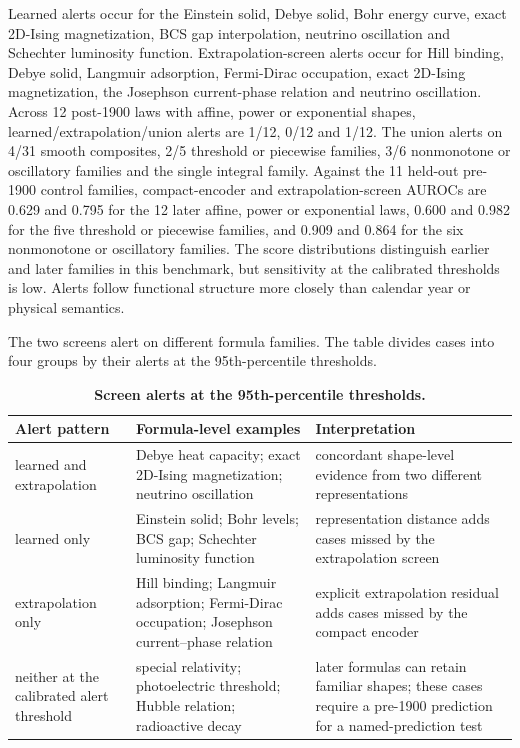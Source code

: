 \documentclass{article}
\begin{document}
Learned alerts occur for the Einstein solid, Debye solid, Bohr energy curve, exact 2D-Ising magnetization, BCS gap interpolation, neutrino oscillation and Schechter luminosity function. Extrapolation-screen alerts occur for Hill binding, Debye solid, Langmuir adsorption, Fermi-Dirac occupation, exact 2D-Ising magnetization, the Josephson current-phase relation and neutrino oscillation. Across 12 post-1900 laws with affine, power or exponential shapes, learned/extrapolation/union alerts are 1/12, 0/12 and 1/12. The union alerts on 4/31 smooth composites, 2/5 threshold or piecewise families, 3/6 nonmonotone or oscillatory families and the single integral family. Against the 11 held-out pre-1900 control families, compact-encoder and extrapolation-screen AUROCs are 0.629 and 0.795 for the 12 later affine, power or exponential laws, 0.600 and 0.982 for the five threshold or piecewise families, and 0.909 and 0.864 for the six nonmonotone or oscillatory families. The score distributions distinguish earlier and later families in this benchmark, but sensitivity at the calibrated thresholds is low. Alerts follow functional structure more closely than calendar year or physical semantics.

The two screens alert on different formula families. The table divides cases into four groups by their alerts at the 95th-percentile thresholds.

\begin{table}[htbp]
\centering
\caption{\textbf{Screen alerts at the 95th-percentile thresholds.}}
\small
\begin{tabular}{@{}>{\RaggedRight\arraybackslash}p{}
                  >{\RaggedRight\arraybackslash}p{}
                  >{\RaggedRight\arraybackslash}p{}@{}}
\toprule
Alert pattern & Formula-level examples & Interpretation \\
\midrule
learned and extrapolation & Debye heat capacity; exact 2D-Ising magnetization; neutrino
oscillation & concordant shape-level evidence from two different representations \\
learned only & Einstein solid; Bohr levels; BCS gap; Schechter luminosity function &
representation distance adds cases missed by the extrapolation screen \\
extrapolation only & Hill binding; Langmuir adsorption; Fermi-Dirac occupation; Josephson
current--phase relation & explicit extrapolation residual adds cases missed by the
compact encoder \\
neither at the calibrated alert threshold & special relativity; photoelectric threshold;
Hubble relation; radioactive decay & later formulas can retain familiar shapes; these cases require a
pre-1900 prediction for a named-prediction test \\
\bottomrule
\end{tabular}
\end{table}
\end{document}
